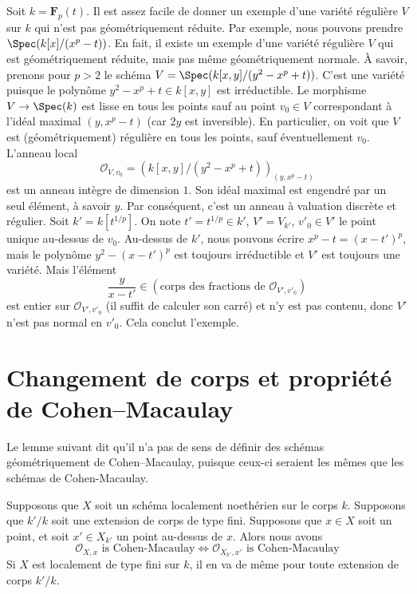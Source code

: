 \begin{example}
\label{example-geometrically-reduced-not-normal}
Soit $k =\mathbf{F}_p(t)$. Il est assez facile de donner un
exemple d'une variété régulière $V$ sur $k$ qui n'est pas
géométriquement réduite. Par exemple, nous pouvons prendre
$\Spec(k[x]/(x^p - t))$. En fait, il existe un exemple d'une
variété régulière $V$ qui est géométriquement réduite, mais pas même
géométriquement normale. À savoir, prenons pour $p > 2$ le schéma $V
= \Spec(k[x, y]/(y^2 - x^p + t))$. C'est une variété puisque le
polynôme $y^2 - x^p + t \in k[x, y]$ est irréductible. Le morphisme
$V \to \Spec(k)$ est lisse en tous les points sauf au point $v_0 \in
V$ correspondant à l'idéal maximal $(y, x^p - t)$ (car $2y$ est
inversible). En particulier, on voit que $V$ est (géométriquement)
régulière en tous les points, sauf éventuellement $v_0$. L'anneau local
$$
\mathcal{O}_{V, v_0} = \left(k[x, y]/(y^2 - x^p + t)\right)_{(y, x^p - t)}
$$
est un anneau intègre de dimension $1$. Son idéal maximal est engendré
par un seul élément, à savoir $y$. Par conséquent, c'est un anneau
à valuation discrète et régulier. Soit $k' = k[t^{1/p}]$. On note
$t' = t^{1/p} \in k'$, $V' = V_{k'}$, $v'_0 \in V'$ le point
unique au-dessus de $v_0$. Au-dessus de $k'$, nous pouvons écrire
$x^p - t = (x - t')^p$, mais le polynôme $y^2 - (x - t')^p$ est
toujours irréductible et $V'$ est toujours une variété. Mais l'élément
$$
\frac{y}{x - t'} \in (\text{corps des fractions de }\mathcal{O}_{V', v'_0})
$$
est entier sur $\mathcal{O}_{V', v'_0}$ (il suffit
de calculer son carré) et n'y est pas contenu, donc
$V'$ n'est pas normal en $v'_0$. Cela conclut l'exemple.
\end{example}







\section{Changement de corps et propriété de Cohen--Macaulay}
\label{section-CM}

\noindent
Le lemme suivant dit qu'il n'a pas de sens de définir
des schémas géométriquement de Cohen--Macaulay, puisque
ceux-ci seraient les mêmes que les schémas de Cohen-Macaulay.

\begin{lemma}
\label{lemma-CM-base-change}
Supposons que $X$ soit un schéma localement noethérien sur le
corps $k$. Supposons que $k'/k$ soit une extension de corps de
type fini. Supposons que $x \in X$ soit un point, et soit $x'
\in X_{k'}$ un point au-dessus de $x$. Alors nous avons
$$
\mathcal{O}_{X, x}\text{ is Cohen-Macaulay}
\Leftrightarrow
\mathcal{O}_{X_{k'}, x'}\text{ is Cohen-Macaulay}
$$
Si $X$ est localement de type fini sur $k$, il en
va de même pour toute extension de corps $k'/k$.
\end{lemma}

